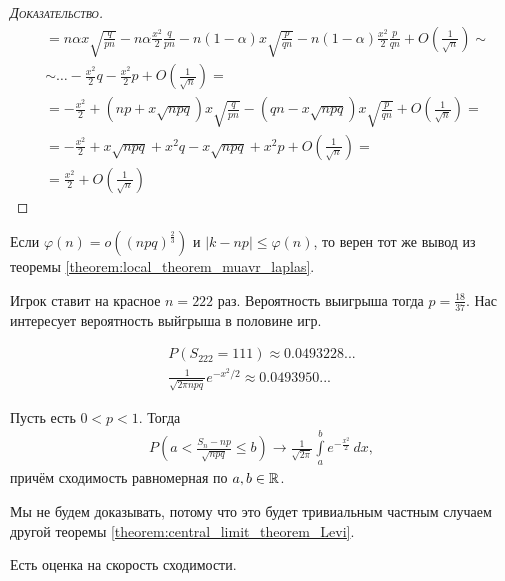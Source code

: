 \documentclass[../main.tex]{subfiles}
\begin{document}
\begin{proof}[\normalfont\textsc{Доказательство}]
\begin{align*}
  &= n\alpha x \sqrt{\frac{q}{pn}} - n\alpha \frac{x^{2}}{2}\frac{q}{pn} - n(1-\alpha)x \sqrt{\frac{p}{qn}} - n(1-\alpha)\frac{x^{2}}{2} \frac{p}{qn} + O\left(\frac{1}{\sqrt{n}}\right) \sim \\
  &\sim \ldots - \frac{x^{2}}{2}q - \frac{x^{2}}{2}p + O\left(\frac{1}{\sqrt{n}}\right) = \\
  &= -\frac{x^{2}}{2} + \left( np + x\sqrt{npq} \right)x \sqrt{\frac{q}{pn}} - (qn - x\sqrt{npq})x\sqrt{\frac{p}{qn}} + O \left( \frac{1}{\sqrt{n}} \right) = \\
  &= -\frac{x^{2}}{2} + x\sqrt{npq} + x^{2}q - x\sqrt{npq} + x^{2}p + O \left( \frac{1}{\sqrt{n}} \right) = \\
  &= \frac{x^{2}}{2} + O \left( \frac{1}{\sqrt{n}} \right)
 \end{align*} 
\end{proof}

\begin{remrk}
 Если $\varphi(n) = o((npq)^{\frac{2}{3}})$ и $\left| k-np \right| \leqslant \varphi(n)$, то верен тот же вывод из теоремы \ref{theorem:local_theorem_muavr_laplas}.
\end{remrk}


\begin{exmpl*}
	Игрок ставит на красное $n = 222$ раз.
	Вероятность выигрыша тогда $p = \frac{18}{37}$.
	Нас интересует вероятность выйгрыша в половине игр.

	\begin{align*}
	  P(S_{222} = 111) \approx 0.0493228... \\
	  \frac{1}{\sqrt{2 \pi n p q}} e^{-x^2/2} \approx 0.0493950...
	\end{align*}
\end{exmpl*}

\begin{thm}
 \label{theorem:intergram_theorem_muavr_laplas}
 Пусть есть $0 < p < 1$. Тогда
 \begin{align*}
  P\left(a < \frac{S_n - np}{\sqrt{npq}} \leqslant b\right) \to \frac{1}{\sqrt{2\pi}} \int\limits_{a}^{b} e^{-\frac{x^{2}}{2}}\,dx
 ,\end{align*} причём сходимость равномерная по $a, b \in \mathbb{R}$.
\end{thm}

Мы не будем доказывать, потому что это будет тривиальным частным случаем другой теоремы \eqref{theorem:central_limit_theorem_Levi}.

Есть оценка на скорость сходимости.
\end{document}
